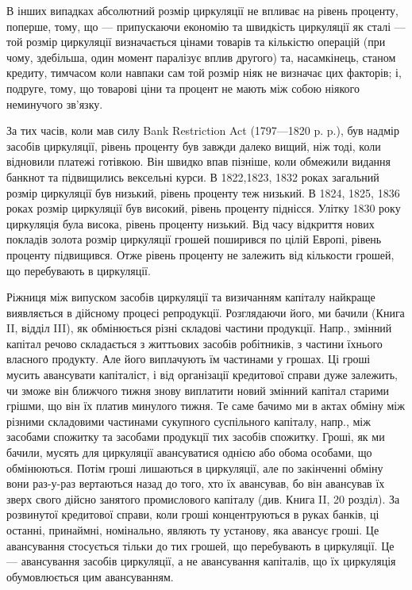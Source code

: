 
В інших випадках абсолютний розмір циркуляції не впливає на рівень
проценту, поперше, тому, що — припускаючи економію та швидкість циркуляції
як сталі — той розмір циркуляції визначається цінами товарів та кількістю операцій
(при чому, здебільша, один момент паралізує вплив другого) та, насамкінець,
станом кредиту, тимчасом коли навпаки сам той розмір ніяк не визначає
цих факторів; і, подруге, тому, що товарові ціни та процент не мають між собою
ніякого неминучого зв’язку.

За тих часів, коли мав силу Bank Restriction Act (1797—1820 p. p.),
був надмір засобів циркуляції, рівень проценту був завжди далеко вищий, ніж
тоді, коли відновили платежі готівкою. Він швидко впав пізніше, коли обмежили
видання банкнот та підвищились вексельні курси. В 1822,1823, 1832 роках
загальний розмір циркуляції був низький, рівень проценту теж низький. В 1824,
1825, 1836 роках розмір циркуляції був високий, рівень проценту піднісся.
Улітку 1830 року циркуляція була висока, рівень проценту низький. Від часу
відкриття нових покладів золота розмір циркуляції грошей поширився по цілій
Европі, рівень проценту підвищився. Отже рівень проценту не залежить від
кількости грошей, що перебувають в циркуляції.

Ріжниця між випуском засобів циркуляції та визичанням капіталу найкраще
виявляється в дійсному процесі репродукції. Розглядаючи його, ми бачили (Книга II,
відділ III), як обмінюється різні складові частини продукції. Напр., змінний капітал
речово складається з життьових засобів робітників, з частини їхнього власного
продукту. Але його виплачують їм частинами у грошах. Ці гроші мусить
авансувати капіталіст, і від організації кредитової справи дуже залежить, чи
зможе він ближчого тижня знову виплатити новий змінний капітал старими
грішми, що він їх платив минулого тижня. Те саме бачимо ми в актах обміну
між різними складовими частинами сукупного суспільного капіталу, напр., між
засобами спожитку та засобами продукції тих засобів спожитку. Гроші, як ми
бачили, мусять для циркуляції авансуватися однією або обома особами, що обмінюються.
Потім гроші лишаються в циркуляції, але по закінченні обміну вони
раз-у-раз вертаються назад до того, хто їх авансував, бо він авансував їх зверх
свого дійсно занятого промислового капіталу (див. Книга II, 20 розділ). За розвинутої
кредитової справи, коли гроші концентруються в руках банків, ці останні,
принаймні, номінально, являють ту установу, яка авансує гроші. Це авансування
стосується тільки до тих грошей, що перебувають в циркуляції. Це — авансування
засобів циркуляції, а не авансування капіталів, що їх циркуляція обумовлюється
цим авансуванням.

